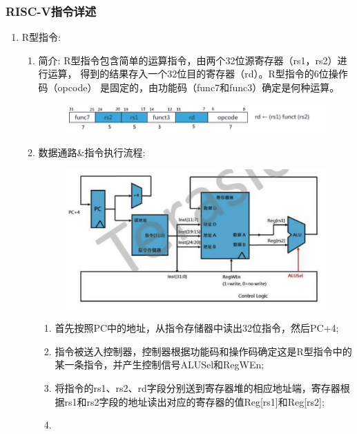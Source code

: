 \documentclass[a4paper, 14pt, oneside]{book} %
\numberwithin{equation}{subsection}
\begin{document}
			\subsubsection{RISC-V指令详述}
			\begin{enumerate}
				\item{R型指令:}
					\begin{enumerate}
						\item{简介:}
							\subitem
								R型指令包含简单的运算指令，由两个32位源寄存器（rs1，rs2）进行运算，
								得到的结果存入一个32位目的寄存器（rd）。R型指令的6位操作码（opcode）
								是固定的，由功能码（func7和func3）确定是何种运算。
								\begin{figure}[!htbp]
									\centering
									\includegraphics[scale=0.5]{img/r1.png}
								\end{figure}
						\item{数据通路\&指令执行流程:}
							\begin{figure}[!htbp]
								\centering
								\includegraphics[scale=0.5]{img/r2.png}
							\end{figure}
							\begin{enumerate}
								\item
									首先按照PC中的地址，从指令存储器中读出32位指令，然后PC+4;
								\item
									指令被送入控制器，控制器根据功能码和操作码确定这是R型指令中的某一条指令，并产生控制信号ALUSel和RegWEn;
								\item
									将指令的rs1、rs2、rd字段分别送到寄存器堆的相应地址端，寄存器根据rs1和rs2字段的地址读出对应的寄存器的值Reg[rs1]和Reg[rs2];
								\item

\end{enumerate}
\end{enumerate}
\end{enumerate}
\end{document}
